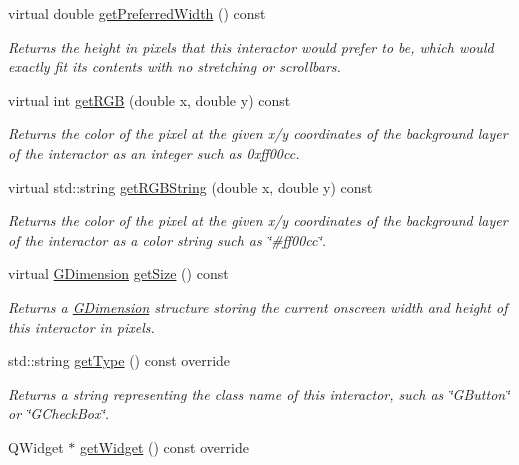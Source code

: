 \begin{DoxyCompactItemize}
virtual double \mbox{\hyperlink{classsgl_1_1GInteractor_a82bca31d37700fb0e35d2743352efd5e}{get\+Preferred\+Width}} () const
\begin{DoxyCompactList}\small\item\em Returns the height in pixels that this interactor would prefer to be, which would exactly fit its contents with no stretching or scrollbars. \end{DoxyCompactList}\item 
virtual int \mbox{\hyperlink{classsgl_1_1GDrawingSurface_a9e983467cf0c97cfd62433a8471570dc}{get\+R\+GB}} (double x, double y) const
\begin{DoxyCompactList}\small\item\em Returns the color of the pixel at the given x/y coordinates of the background layer of the interactor as an integer such as 0xff00cc. \end{DoxyCompactList}\item 
virtual std\+::string \mbox{\hyperlink{classsgl_1_1GDrawingSurface_a456d3582acc3544f37d939f5cb8802fe}{get\+R\+G\+B\+String}} (double x, double y) const
\begin{DoxyCompactList}\small\item\em Returns the color of the pixel at the given x/y coordinates of the background layer of the interactor as a color string such as \char`\"{}\#ff00cc\char`\"{}. \end{DoxyCompactList}\item 
virtual \mbox{\hyperlink{structsgl_1_1GDimension}{G\+Dimension}} \mbox{\hyperlink{classsgl_1_1GInteractor_a7b4eec96a2bdc6420695d5796a78eea9}{get\+Size}} () const
\begin{DoxyCompactList}\small\item\em Returns a \mbox{\hyperlink{structsgl_1_1GDimension}{G\+Dimension}} structure storing the current onscreen width and height of this interactor in pixels. \end{DoxyCompactList}\item 
std\+::string \mbox{\hyperlink{classsgl_1_1GCanvas_a9b72ede4ee8520f987a0c01e30654814}{get\+Type}} () const override
\begin{DoxyCompactList}\small\item\em Returns a string representing the class name of this interactor, such as \char`\"{}\+G\+Button\char`\"{} or \char`\"{}\+G\+Check\+Box\char`\"{}. \end{DoxyCompactList}\item 
Q\+Widget $\ast$ \mbox{\hyperlink{classsgl_1_1GCanvas_a3b33a602b31a6b809d020535a59db3b4}{get\+Widget}} () const override

\end{DoxyCompactItemize}

